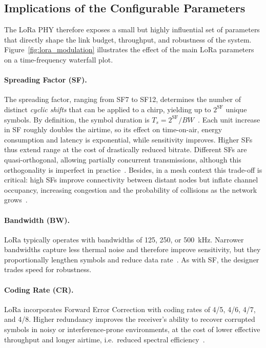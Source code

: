 \documentclass[english,bachelor]{tfgitic}[2026/01/22]
\begin{document}
\subsection*{Implications of the Configurable Parameters}
The LoRa PHY therefore exposes a small but highly influential set of parameters that directly shape the link budget, throughput, and robustness of the system. Figure~\ref{fig:lora_modulation} illustrates the effect of the main LoRa parameters on a time-frequency waterfall plot.


\paragraph{Spreading Factor (SF).} The spreading factor, ranging from SF7 to SF12, determines the number of distinct \emph{cyclic shifts} that can be applied to a chirp, yielding up to $2^{\mathrm{SF}}$ unique symbols. 
By definition, the symbol duration is $T_s = 2^{\mathrm{SF}}/BW$~\cite{semtech2015an1200}. Each unit increase in SF roughly doubles the airtime, so its effect on time-on-air, 
energy consumption and latency is exponential, while sensitivity improves. Higher SFs thus extend range at the cost of drastically 
reduced bitrate. Different SFs are quasi-orthogonal, allowing partially concurrent transmissions, although this orthogonality is imperfect in 
practice~\cite{croce2018orthogonality}. Besides, in a mesh context this trade-off is critical: high SFs improve connectivity between distant nodes but inflate 
channel occupancy, increasing congestion and the probability of collisions as the network grows~\cite{bor2016scale}.

\paragraph{Bandwidth (BW).} LoRa typically operates with bandwidths of 125, 250, or 500~kHz. Narrower bandwidths capture less thermal noise and therefore improve 
sensitivity, but they proportionally lengthen symbols and reduce data rate~\cite{augustin2016study}. As with SF, the designer trades speed for robustness.

\paragraph{Coding Rate (CR).} LoRa incorporates Forward Error Correction with coding rates of 4/5, 4/6, 4/7, and 4/8. Higher redundancy improves the 
receiver's ability to recover corrupted symbols in noisy or interference-prone environments, at the cost of lower effective throughput and longer 
airtime, i.e.\ reduced spectral efficiency~\cite{semtech2015an1200}.
\end{document}
